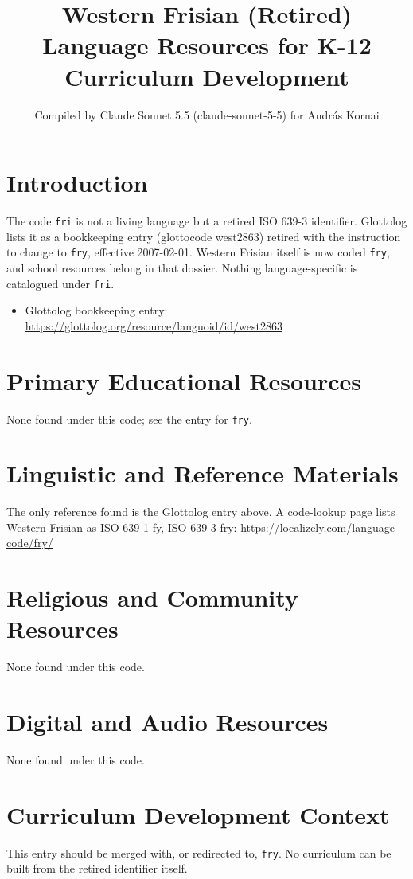 \documentclass[12pt]{article}
\title{Western Frisian (Retired) Language Resources for K-12 Curriculum Development}
\author{Compiled by Claude Sonnet 5.5 (claude-sonnet-5-5) for Andr\'as Kornai}
\date{}
\begin{document}
\maketitle
\section{Introduction}
The code \texttt{fri} is not a living language but a retired ISO 639-3 identifier. Glottolog lists it as a bookkeeping entry (glottocode west2863) retired with the instruction to change to \texttt{fry}, effective 2007-02-01. Western Frisian itself is now coded \texttt{fry}, and school resources belong in that dossier. Nothing language-specific is catalogued under \texttt{fri}.
\begin{itemize}
\item Glottolog bookkeeping entry: \url{https://glottolog.org/resource/languoid/id/west2863}
\end{itemize}
\section{Primary Educational Resources}
None found under this code; see the entry for \texttt{fry}.
\section{Linguistic and Reference Materials}
The only reference found is the Glottolog entry above. A code-lookup page lists Western Frisian as ISO 639-1 fy, ISO 639-3 fry: \url{https://localizely.com/language-code/fry/}
\section{Religious and Community Resources}
None found under this code.
\section{Digital and Audio Resources}
None found under this code.
\section{Curriculum Development Context}
This entry should be merged with, or redirected to, \texttt{fry}. No curriculum can be built from the retired identifier itself.
\end{document}
